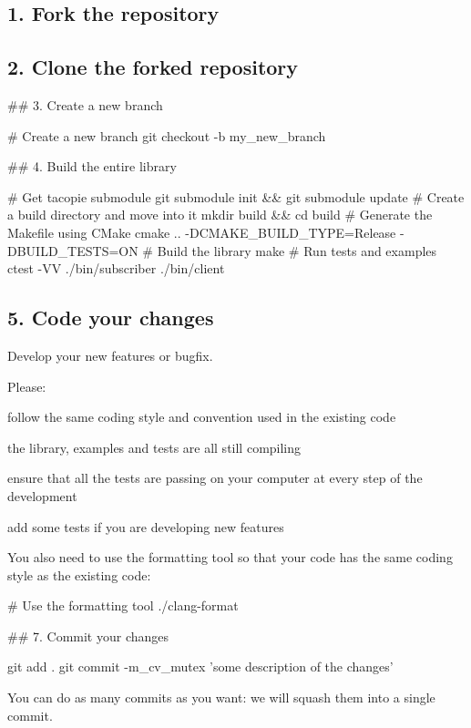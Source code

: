 \subsection*{1. Fork the repository}

\subsection*{2. Clone the forked repository}

\#\# 3. Create a new branch 
\begin{DoxyCode}
# Create a new branch
git checkout -b my\_new\_branch
\end{DoxyCode}


\#\# 4. Build the entire library 
\begin{DoxyCode}
# Get tacopie submodule
git submodule init && git submodule update
# Create a build directory and move into it
mkdir build && cd build
# Generate the Makefile using CMake
cmake .. -DCMAKE\_BUILD\_TYPE=Release -DBUILD\_TESTS=ON
# Build the library
make
# Run tests and examples
ctest -VV
./bin/subscriber
./bin/client
\end{DoxyCode}


\subsection*{5. Code your changes}

Develop your new features or bugfix.

Please\+:
\begin{DoxyItemize}
\item follow the same coding style and convention used in the existing code
\item the library, examples and tests are all still compiling
\item ensure that all the tests are passing on your computer at every step of the development
\item add some tests if you are developing new features
\end{DoxyItemize}

You also need to use the formatting tool so that your code has the same coding style as the existing code\+:


\begin{DoxyCode}
# Use the formatting tool
./clang-format
\end{DoxyCode}


\#\# 7. Commit your changes 
\begin{DoxyCode}
git add .
git commit -m_cv_mutex 'some description of the changes'
\end{DoxyCode}
 You can do as many commits as you want\+: we will squash them into a single commit.


